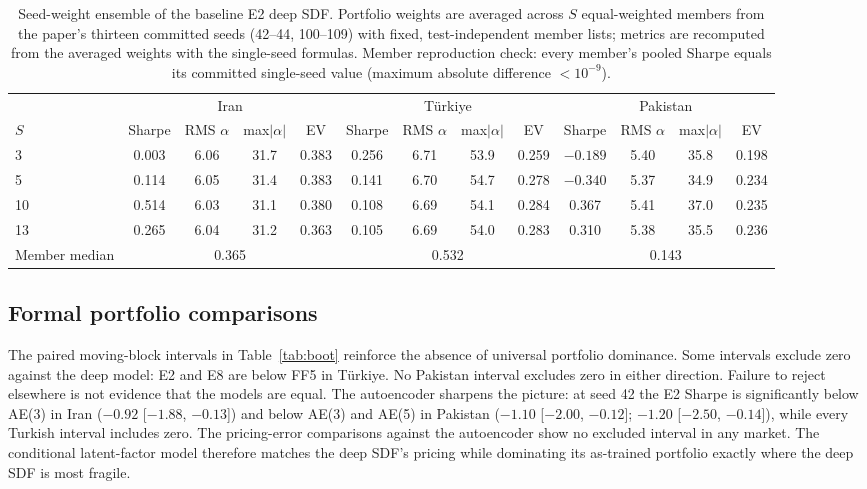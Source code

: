 \documentclass[12pt]{article}
\begin{document}
\begin{table}[htbp]
\centering
\caption{Seed-weight ensemble of the baseline E2 deep SDF. Portfolio weights are averaged across $S$ equal-weighted members from the paper's thirteen committed seeds (42--44, 100--109) with fixed, test-independent member lists; metrics are recomputed from the averaged weights with the single-seed formulas. Member reproduction check: every member's pooled Sharpe equals its committed single-seed value (maximum absolute difference $<10^{-9}$).}
\label{tab:ens}
\scriptsize
\setlength{\tabcolsep}{3pt}
\begin{tabular}{l cccc cccc cccc}
\toprule
 & \multicolumn{4}{c}{Iran} & \multicolumn{4}{c}{T\"urkiye} & \multicolumn{4}{c}{Pakistan} \\
\cmidrule(lr){2-5}\cmidrule(lr){6-9}\cmidrule(lr){10-13}
$S$ & Sharpe & RMS $\alpha$ & max$|\alpha|$ & EV & Sharpe & RMS $\alpha$ & max$|\alpha|$ & EV & Sharpe & RMS $\alpha$ & max$|\alpha|$ & EV \\
\midrule
3 & 0.003 & 6.06 & 31.7 & 0.383 & 0.256 & 6.71 & 53.9 & 0.259 & $-0.189$ & 5.40 & 35.8 & 0.198 \\
5 & 0.114 & 6.05 & 31.4 & 0.383 & 0.141 & 6.70 & 54.7 & 0.278 & $-0.340$ & 5.37 & 34.9 & 0.234 \\
10 & 0.514 & 6.03 & 31.1 & 0.380 & 0.108 & 6.69 & 54.1 & 0.284 & 0.367 & 5.41 & 37.0 & 0.235 \\
13 & 0.265 & 6.04 & 31.2 & 0.363 & 0.105 & 6.69 & 54.0 & 0.283 & 0.310 & 5.38 & 35.5 & 0.236 \\
\midrule
Member median & \multicolumn{4}{c}{0.365} & \multicolumn{4}{c}{0.532} & \multicolumn{4}{c}{0.143} \\
\bottomrule
\end{tabular}
\end{table}

\subsection{Formal portfolio comparisons}\label{sec:formal}

The paired moving-block intervals in Table~\ref{tab:boot} reinforce the absence of universal portfolio dominance. Some intervals exclude zero against the deep model: E2 and E8 are below FF5 in T\"urkiye. No Pakistan interval excludes zero in either direction. Failure to reject elsewhere is not evidence that the models are equal. The autoencoder sharpens the picture: at seed 42 the E2 Sharpe is significantly below AE(3) in Iran ($-0.92$ [$-1.88$, $-0.13$]) and below AE(3) and AE(5) in Pakistan ($-1.10$ [$-2.00$, $-0.12$]; $-1.20$ [$-2.50$, $-0.14$]), while every Turkish interval includes zero. The pricing-error comparisons against the autoencoder show no excluded interval in any market. The conditional latent-factor model therefore matches the deep SDF's pricing while dominating its as-trained portfolio exactly where the deep SDF is most fragile.
\end{document}
